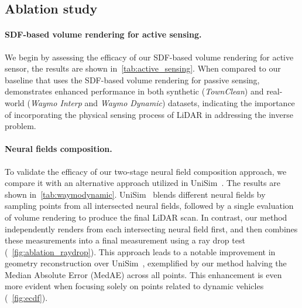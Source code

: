 














\subsection{Ablation study}
\paragraph{SDF-based volume rendering for active sensing.}
We begin by assessing the efficacy of our SDF-based volume rendering for active sensor, the results are shown in~\cref{tab:active_sensing}. When compared to our baseline that uses the SDF-based volume rendering for passive sensing, \dynfl demonstrates enhanced performance in both synthetic (\textit{TownClean}) and real-world (\textit{Waymo Interp} and \textit{Waymo Dynamic}) datasets, indicating the importance of incorporating the physical sensing process of LiDAR in addressing the inverse problem.


\paragraph{Neural fields composition.} 
To validate the efficacy of our two-stage neural field composition approach, we compare it with an alternative approach utilized in UniSim~\cite{yang2023unisim}. The results are shown in~\cref{tab:waymodynamic}. UniSim~\cite{yang2023unisim} blends different neural fields by sampling points from all intersected neural fields, followed by a single evaluation of volume rendering to produce the final LiDAR scan. In contrast, our method independently renders from each intersecting neural field first, and then combines these measurements into a final measurement using a ray drop test (\cf~\cref{fig:ablation_raydrop}). This approach leads to a notable improvement in geometry reconstruction over UniSim~\cite{yang2023unisim}, exemplified by our method halving the Median Absolute Error (MedAE) across all points. This enhancement is even more evident when focusing solely on points related to dynamic vehicles (\cf~\cref{fig:ecdf}).
% 

